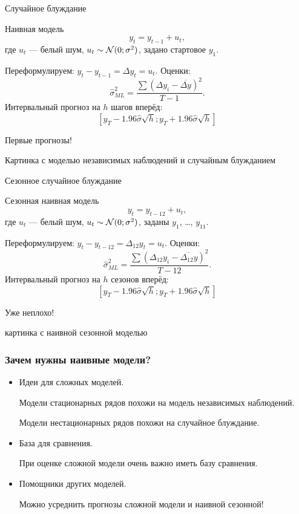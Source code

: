 \begin{frame}{Случайное блуждание}

  \begin{block}{Наивная модель}
  \[
  y_t = y_{t-1} + u_t,  
  \]
  где $u_t$ — белый шум, $u_t \sim \mathcal{N}(0;\sigma^2)$, задано стартовое $y_1$.
  \end{block}
  \pause
  Переформулируем: $y_t - y_{t-1} = \Delta y_t = u_t$.
  \pause
  \alert{Оценки:}
  \[
  \hat\sigma^2_{ML} = \frac{\sum(\Delta y_i - \overline {\Delta y})^2}{T - 1}.  
  \]
  \pause
  \alert{Интервальный прогноз} на $h$ шагов вперёд:
  \[
  [y_T - 1.96 \hat \sigma \sqrt{h}; y_T + 1.96 \hat \sigma  \sqrt{h}]  
  \]
\end{frame}

\begin{frame}{Первые прогнозы!}

  Картинка с моделью независимых наблюдений и случайным блужданием

\end{frame}


\begin{frame}{Сезонное случайное блуждание}

  \begin{block}{Сезонная наивная модель}
  \[
  y_t = y_{t-12} + u_t,  
  \]
  где $u_t$ — белый шум, $u_t \sim \mathcal{N}(0;\sigma^2)$, заданы $y_1$, \ldots, $y_{11}$.
  \end{block}
  \pause
  Переформулируем: $y_t - y_{t-12} = \Delta_{12} y_t = u_t$.
  \pause
  \alert{Оценки:}
  \[
  \hat\sigma^2_{ML} = \frac{\sum(\Delta_{12} y_i - \overline {\Delta_{12} y})^2}{T - 12}.  
  \]
  \pause
  \alert{Интервальный прогноз} на $h$ \alert{сезонов} вперёд:
  \[
  [y_{T} - 1.96 \hat \sigma \sqrt{h}; y_{T} + 1.96 \hat \sigma  \sqrt{h}]  
  \]
\end{frame}

\begin{frame}{Уже неплохо!}

  картинка с наивной сезонной моделью 

\end{frame}


\begin{frame}
  \frametitle{Зачем нужны наивные модели?}

  \begin{itemize}[<+->]
    \item \alert{Идеи} для сложных моделей.
    
    Модели \alert{стационарных рядов} похожи на модель независимых наблюдений. 

    Модели \alert{нестационарных рядов} похожи на случайное блуждание. 

    \item \alert{База для сравнения}. 
    
    При оценке сложной модели очень важно иметь базу сравнения. 

    \item \alert{Помощники} других моделей. 
    
    Можно \alert{усреднить прогнозы} сложной модели и наивной сезонной!
  \end{itemize}
  

\end{frame}


